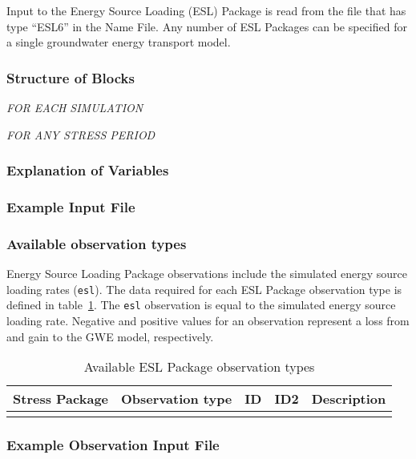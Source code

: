 Input to the Energy Source Loading (ESL) Package is read from the file that has type ``ESL6'' in the Name File.  Any number of ESL Packages can be specified for a single groundwater energy transport model.

\vspace{5mm}
\subsubsection{Structure of Blocks}
\vspace{5mm}

\noindent \textit{FOR EACH SIMULATION}


\vspace{5mm}
\noindent \textit{FOR ANY STRESS PERIOD}

\packageperioddescription

\vspace{5mm}
\subsubsection{Explanation of Variables}
\begin{description}

\end{description}

\vspace{5mm}
\subsubsection{Example Input File}


\vspace{5mm}
\subsubsection{Available observation types}
Energy Source Loading Package observations include the simulated energy source loading rates (\texttt{esl}). The data required for each ESL Package observation type is defined in table~\ref{table:gwe-eslobstype}. The \texttt{esl} observation is equal to the simulated energy source loading rate. Negative and positive values for an observation represent a loss from and gain to the GWE model, respectively.

\begin{longtable}{p{2cm} p{2.75cm} p{2cm} p{1.25cm} p{7cm}}
\caption{Available ESL Package observation types} \tabularnewline

\hline
\hline
\textbf{Stress Package} & \textbf{Observation type} & \textbf{ID} & \textbf{ID2} & \textbf{Description} \\
\hline
\endhead

\hline
\endfoot


\label{table:gwe-eslobstype}
\end{longtable}

\vspace{5mm}
\subsubsection{Example Observation Input File}

